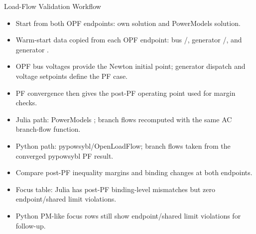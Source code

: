 \begin{frame}{Load-Flow Validation Workflow}
\small
\begin{itemize}
  \item Start from both OPF endpoints: own solution and PowerModels solution.
  \item Warm-start data copied from each OPF endpoint: bus /, generator /, and generator .
  \item OPF bus voltages provide the Newton initial point; generator dispatch and voltage setpoints define the PF case.
  \item PF convergence then gives the post-PF operating point used for margin checks.
  \item Julia path: PowerModels ; branch flows recomputed with the same AC branch-flow function.
  \item Python path: pypowsybl/OpenLoadFlow; branch flows taken from the converged pypowsybl PF result.
  \item Compare post-PF inequality margins and binding changes at both endpoints.
  \item Focus table: Julia has post-PF binding-level mismatches but zero endpoint/shared limit violations.
  \item Python PM-like focus rows still show endpoint/shared limit violations for follow-up.
\end{itemize}

\vspace{0.4em}
\end{frame}
